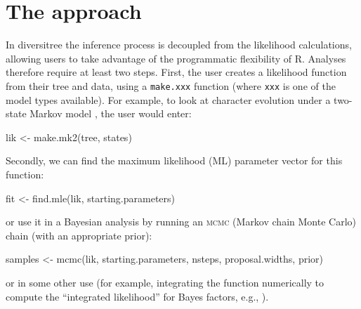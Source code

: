 \documentclass[12pt]{article}
\newcommand\code\texttt
\begin{document}
\section{The approach}
In diversitree the inference process is decoupled from the likelihood
calculations, allowing users to take advantage of the programmatic
flexibility of R.  Analyses therefore require at least two steps.
First, the user creates a likelihood function from their tree and
data, using a \code{make.xxx} function (where \code{xxx} is one of the
model types available).
%
For example, to look at character evolution under a two-state Markov
model \citep{Lewis-2001-913}, the user would enter:
\begin{Sinput}
lik <- make.mk2(tree, states)
\end{Sinput}
Secondly, we can find the maximum likelihood (ML) parameter vector for
this function:
\begin{Sinput}
fit <- find.mle(lik, starting.parameters)
\end{Sinput}
or use it in a Bayesian analysis by running an \textsc{mcmc} (Markov
chain Monte Carlo) chain (with an appropriate prior):
\begin{Sinput}
samples <- mcmc(lik, starting.parameters, nsteps, proposal.widths, prior)
\end{Sinput}
or in some other use (for example, integrating the function
numerically to compute the ``integrated likelihood'' for Bayes
factors, e.g., \citealp{Kass-1995-773}).
%
%
\end{document}
